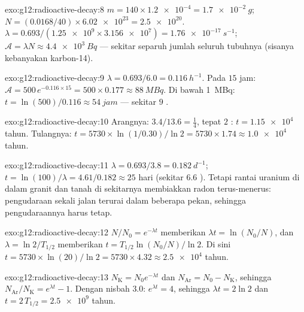 \begin{solution}{exo:g12:radioactive-decay:8}
$m = 140 \times \num{1.2e-4} = \qty{1.7e-2}{g}$;
$N = (0.0168/40) \times \num{6.02e23} = \num{2.5e20}$.
$\lambda = 0.693/(\num{1.25e9} \times \num{3.156e7}) =
\qty{1.76e-17}{s^{-1}}$; $\mathcal A = \lambda N \approx
\qty{4.4e3}{Bq}$ --- sekitar separuh jumlah seluruh tubuhnya (sisanya kebanyakan
karbon-14).
\end{solution}

\begin{solution}{exo:g12:radioactive-decay:9}
$\lambda = 0.693/6.0 = \qty{0.116}{h^{-1}}$. Pada $15$ jam:
$\mathcal A = 500\,e^{-0.116 \times 15} = 500 \times 0.177 \approx
\qty{88}{MBq}$. Di bawah \qty{1}{MBq}:
$t = \ln(500)/0.116 \approx \qty{54}{jam}$ --- sekitar $9$
.
\end{solution}

\begin{solution}{exo:g12:radioactive-decay:10}
Arangnya: $3.4/13.6 = \tfrac14$, tepat $2$ :
$t = \num{1.15e4}$ tahun. Tulangnya:
$t = \num{5730} \times \ln(1/0.30)/\ln 2 = \num{5730} \times 1.74
\approx \num{1.0e4}$ tahun.
\end{solution}

\begin{solution}{exo:g12:radioactive-decay:11}
$\lambda = 0.693/3.8 = \qty{0.182}{d^{-1}}$;
$t = \ln(100)/\lambda = 4.61/0.182 \approx 25$ hari (sekitar $6.6$
). Tetapi rantai uranium di dalam granit dan tanah di sekitarnya
membiakkan radon terus-menerus: pengudaraan sekali jalan terurai dalam
beberapa pekan, sehingga pengudaraannya harus tetap.
\end{solution}

\begin{solution}{exo:g12:radioactive-decay:12}
$N/N_0 = e^{-\lambda t}$ memberikan $\lambda t = \ln(N_0/N)$, dan
$\lambda = \ln 2/T_{1/2}$ memberikan $t = T_{1/2}\ln(N_0/N)/\ln 2$. Di sini
$t = \num{5730} \times \ln(20)/\ln 2 = \num{5730} \times 4.32
\approx \num{2.5e4}$ tahun.
\end{solution}

\begin{solution}{exo:g12:radioactive-decay:13}
$N_{\mathrm K} = N_0 e^{-\lambda t}$ dan
$N_{\mathrm{Ar}} = N_0 - N_{\mathrm K}$, sehingga
$N_{\mathrm{Ar}}/N_{\mathrm K} = e^{\lambda t} - 1$. Dengan nisbah $3.0$:
$e^{\lambda t} = 4$, sehingga $\lambda t = 2\ln 2$ dan
$t = 2\,T_{1/2} = \num{2.5e9}$ tahun.
\end{solution}

